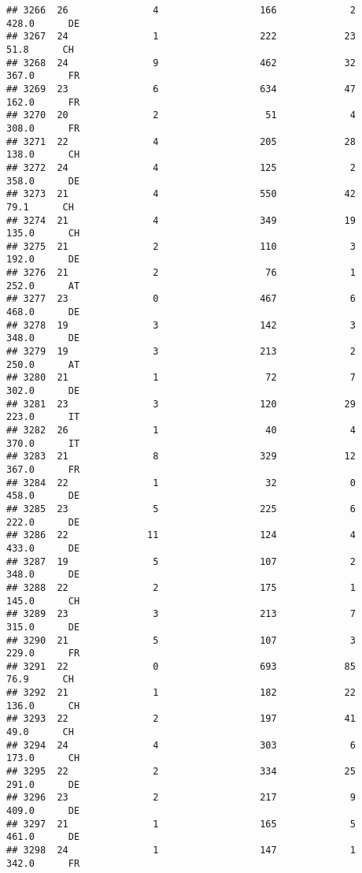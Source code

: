 \documentclass[
]{article}
\begin{document}
\begin{verbatim}
## 3266  26               4                  166             2    428.0      DE
## 3267  24               1                  222            23     51.8      CH
## 3268  24               9                  462            32    367.0      FR
## 3269  23               6                  634            47    162.0      FR
## 3270  20               2                   51             4    308.0      FR
## 3271  22               4                  205            28    138.0      CH
## 3272  24               4                  125             2    358.0      DE
## 3273  21               4                  550            42     79.1      CH
## 3274  21               4                  349            19    135.0      CH
## 3275  21               2                  110             3    192.0      DE
## 3276  21               2                   76             1    252.0      AT
## 3277  23               0                  467             6    468.0      DE
## 3278  19               3                  142             3    348.0      DE
## 3279  19               3                  213             2    250.0      AT
## 3280  21               1                   72             7    302.0      DE
## 3281  23               3                  120            29    223.0      IT
## 3282  26               1                   40             4    370.0      IT
## 3283  21               8                  329            12    367.0      FR
## 3284  22               1                   32             0    458.0      DE
## 3285  23               5                  225             6    222.0      DE
## 3286  22              11                  124             4    433.0      DE
## 3287  19               5                  107             2    348.0      DE
## 3288  22               2                  175             1    145.0      CH
## 3289  23               3                  213             7    315.0      DE
## 3290  21               5                  107             3    229.0      FR
## 3291  22               0                  693            85     76.9      CH
## 3292  21               1                  182            22    136.0      CH
## 3293  22               2                  197            41     49.0      CH
## 3294  24               4                  303             6    173.0      CH
## 3295  22               2                  334            25    291.0      DE
## 3296  23               2                  217             9    409.0      DE
## 3297  21               1                  165             5    461.0      DE
## 3298  24               1                  147             1    342.0      FR

\end{verbatim}
\end{document}
